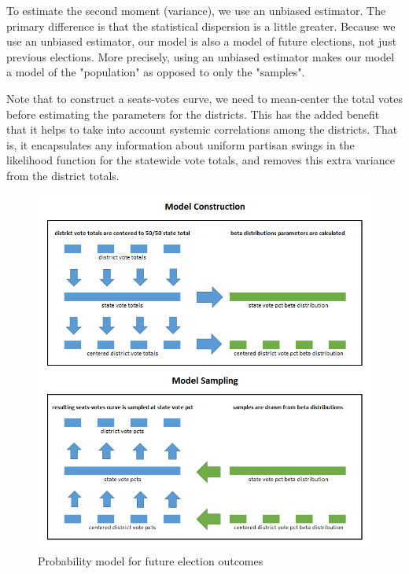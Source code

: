 \documentclass[preprint,12pt]{article}
\begin{document}
To estimate the second moment (variance), we use an unbiased estimator.  The primary difference is that the statistical dispersion is a little greater.  Because we use an unbiased estimator, our model is also a model of future elections, not just previous elections.  More precisely, using an unbiased estimator makes our model a model of the "population" as opposed to only the "samples".
 
Note that to construct a seats-votes curve, we need to mean-center the total votes before estimating the parameters for the districts.  This has the added benefit that it helps to take into account systemic correlations among the districts.  That is, it encapsulates any information about uniform partisan swings in the likelihood function for the statewide vote totals, and removes this extra variance from the district totals.

\begin{figure}[htb!]
    \begin{center}
        \includegraphics[scale=1.0]{../Figures/WI2010/probabilityModel.png}
        \caption{Probability model for future election outcomes}\label{fig:ProbabilityModel}
    \end{center}
\end{figure}
\end{document}
